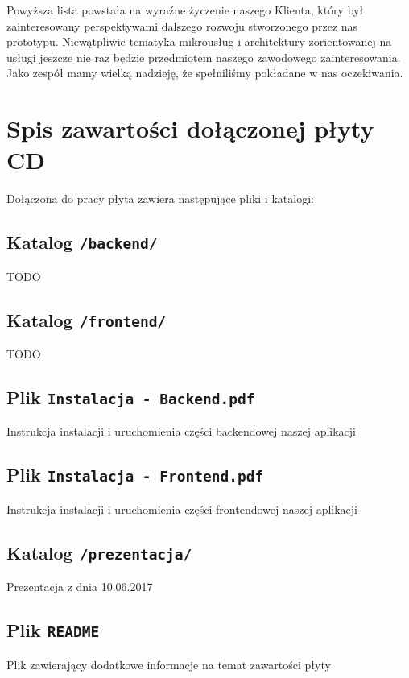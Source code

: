 \documentclass[licencjacka]{pracamgr}
\begin{document}
Powyższa lista powstała na wyraźne życzenie naszego Klienta, który był zainteresowany
perspektywami dalszego rozwoju stworzonego przez nas prototypu. Niewątpliwie tematyka
mikrousług i architektury zorientowanej na usługi jeszcze nie raz będzie przedmiotem
naszego zawodowego zainteresowania. Jako zespół mamy wielką nadzieję, że spełniliśmy
pokładane w nas oczekiwania.

\appendix
\chapter{Spis zawartości dołączonej płyty CD}
Dołączona do pracy płyta zawiera następujące pliki i katalogi:

\section{Katalog \texttt{/backend/}}
TODO

\section{Katalog \texttt{/frontend/}}
TODO

\section{Plik \texttt{Instalacja - Backend.pdf}}
Instrukcja instalacji i uruchomienia części backendowej naszej aplikacji

\section{Plik \texttt{Instalacja - Frontend.pdf}}
Instrukcja instalacji i uruchomienia części frontendowej naszej aplikacji

\section{Katalog \texttt{/prezentacja/}}
Prezentacja z dnia 10.06.2017

\section{Plik \texttt{README}}
Plik zawierający dodatkowe informacje na temat zawartości płyty

%
%
\end{document}
